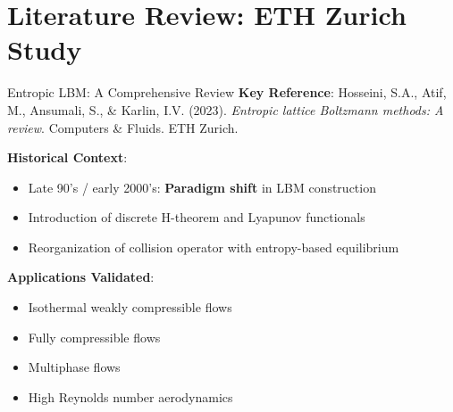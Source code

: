 \documentclass[aspectratio=169]{beamer}
\begin{document}
\section{Literature Review: ETH Zurich Study}

\begin{frame}{Entropic LBM: A Comprehensive Review}
\textbf{Key Reference}: Hosseini, S.A., Atif, M., Ansumali, S., \& Karlin, I.V. (2023).
\textit{Entropic lattice Boltzmann methods: A review}.
Computers \& Fluids. ETH Zurich.

\vspace{0.3cm}
\textbf{Historical Context}:
\begin{itemize}
    \item Late 90's / early 2000's: \textbf{Paradigm shift} in LBM construction
    \item Introduction of discrete H-theorem and Lyapunov functionals
    \item Reorganization of collision operator with entropy-based equilibrium
\end{itemize}

\vspace{0.3cm}
\textbf{Applications Validated}:
\begin{itemize}
    \item Isothermal weakly compressible flows
    \item Fully compressible flows
    \item Multiphase flows
    \item High Reynolds number aerodynamics
\end{itemize}
\end{frame}
\end{document}
